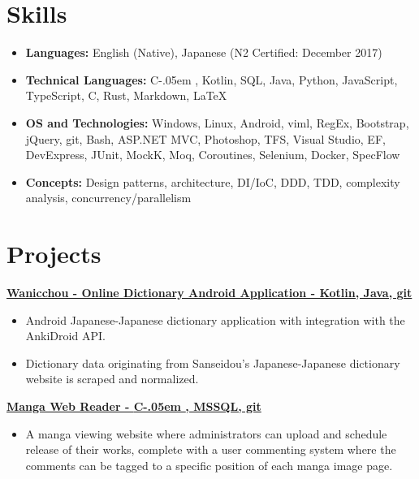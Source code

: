 \documentclass[letterpaper,11pt]{article}
\newcommand{\resumeItem}[2]{
    \vspace{-2pt}
    \item\small{
        \textbf{#1}{ #2 \vspace{-2pt}}
    }
}
\newcommand{\resumeSubItem}[2]{\resumeItem{#1}{#2}}
\newcommand{\resumeItemListStart}{\begin{itemize}}
\newcommand{\resumeItemListEnd}{\end{itemize}}
\def\Cplusplus{C\raisebox{0.5ex}{\tiny\textbf{++}}}
\newcommand{\Csharp}{%
  {\settoheight{\dimen0}{C}C\kern-.05em \resizebox{!}{\dimen0}{\raisebox{\depth}{\#}}}}
\begin{document}
\section{\textbf{Skills}}
\begin{itemize}
    \resumeSubItem{\textbf{Languages:}}
        {
            English (Native),
            Japanese (N2 Certified: December 2017)
        }
    \resumeSubItem{\textbf{Technical Languages:}}
        {
            \Csharp,
            Kotlin,
            SQL,
            Java,
            Python,
            JavaScript,
            TypeScript,
            \Cplusplus,
            Rust,
            Markdown,
            \LaTeX
        }
    \resumeSubItem{\textbf{OS and Technologies:}}
        {
            Windows,
            Linux,
            Android,
            viml,
            RegEx,
            Bootstrap,
            jQuery,
            git,
            Bash,
            ASP.NET MVC,
            Photoshop,
            TFS,
            Visual Studio,
            EF,
            DevExpress,
            JUnit,
            MockK,
            Moq,
            Coroutines,
            Selenium,
            Docker,
            SpecFlow
        }
    \resumeSubItem{\textbf{Concepts:}}
        {
            Design patterns,
            architecture,
            DI/IoC,
            DDD,
            TDD,
            complexity analysis,
            concurrency/parallelism
        }
 \end{itemize}

\section{\textbf{Projects}}
    \small{\textbf{
        \href {
            https://github.com/Limegrass/Wanicchou
        } {
            Wanicchou - Online Dictionary Android Application
            - Kotlin, Java, git
        }}}
    \resumeItemListStart
        \resumeItem{}
            {
                Android Japanese-Japanese dictionary application with integration with the AnkiDroid API.
            }
        \resumeItem{}
            {
                Dictionary data originating from Sanseidou's Japanese-Japanese
                dictionary website is scraped and normalized.
            }
    \resumeItemListEnd
    \small{\textbf{
        \href{
            https://waifusims.com/Manga/Hakoiri
        }{
            Manga Web Reader
            - \Csharp, MSSQL, git
        }}}
    \resumeItemListStart
        \resumeItem{}
            {
                A manga viewing website where administrators can upload and schedule
                release of their works, complete with a user commenting system
                where the comments can be tagged to a specific position of each manga
                image page.
            }
    \resumeItemListEnd
\end{document}
